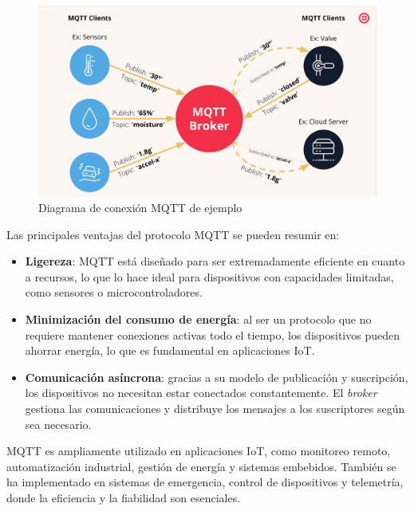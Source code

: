 \begin{figure}[H]
    \centering
    \includegraphics[width = 0.8 \linewidth]{img/mqtt.png}
    \caption{Diagrama de conexión MQTT de ejemplo \cite{mqtt_img}}
    \label{fig:mqtt}
\end{figure}



Las principales ventajas del protocolo MQTT se pueden resumir en:

\begin{itemize}
    \item \textbf{Ligereza}: MQTT está diseñado para ser extremadamente eficiente en cuanto a recursos, lo que lo hace ideal para dispositivos con capacidades limitadas, como sensores o microcontroladores.
    \item \textbf{Minimización del consumo de energía}: al ser un protocolo que no requiere mantener conexiones activas todo el tiempo, los dispositivos pueden ahorrar energía, lo que es fundamental en aplicaciones IoT.
    \item \textbf{Comunicación asíncrona}: gracias a su modelo de publicación y suscripción, los dispositivos no necesitan estar conectados constantemente. El \textit{broker} gestiona las comunicaciones y distribuye los mensajes a los suscriptores según sea necesario.
\end{itemize}



MQTT es ampliamente utilizado en aplicaciones IoT, como monitoreo remoto, automatización industrial, gestión de energía y sistemas embebidos. También se ha implementado en sistemas de emergencia, control de dispositivos y telemetría, donde la eficiencia y la fiabilidad son esenciales.